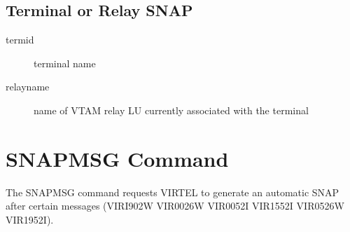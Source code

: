 \documentclass[letterpaper,10pt,english]{sphinxmanual}
\begin{document}
\subsection{Terminal or Relay SNAP}
\label{\detokenize{audit_operations_ and_performance:terminal-or-relay-snap}}
\begin{sphinxVerbatim}[commandchars=\\\{\}]
  
\end{sphinxVerbatim}
\begin{description}
\item[{termid}] \leavevmode
terminal name

\item[{relayname}] \leavevmode
name of VTAM relay LU currently associated with the terminal

\end{description}

\ignorespaces 

\section{SNAPMSG Command}
\label{\detokenize{audit_operations_ and_performance:snapmsg-command}}\label{\detokenize{audit_operations_ and_performance:index-20}}
\begin{sphinxVerbatim}[commandchars=\\\{\}]
\end{sphinxVerbatim}

The SNAPMSG command requests VIRTEL to generate an automatic SNAP after certain messages (VIRI902W VIR0026W VIR0052I VIR1552I VIR0526W VIR1952I).

\begin{sphinxVerbatim}[commandchars=\\\{\}]
\end{sphinxVerbatim}
\end{document}

